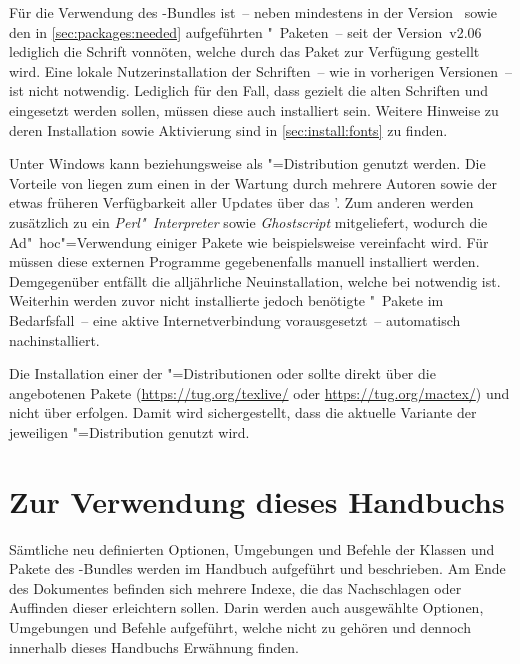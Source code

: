 Für die Verwendung des \TUDScript-Bundles ist~-- neben \KOMAScript mindestens 
in der Version~\vKOMAScript{} sowie den in \autoref{sec:packages:needed} 
aufgeführten "~Paketen~-- seit der Version~v2.06 lediglich die 
Schrift \OpenSans vonnöten, welche durch das Paket  zur 
Verfügung gestellt wird. Eine lokale Nutzerinstallation der Schriften~-- wie in 
vorherigen Versionen~-- ist nicht notwendig. Lediglich für den Fall, dass 
gezielt die alten Schriften \Univers und \DIN eingesetzt werden sollen, müssen 
diese auch installiert sein. Weitere Hinweise zu deren Installation sowie 
Aktivierung sind in \autoref{sec:install:fonts} zu finden.

%
Unter Windows kann  beziehungsweise  
 als "=Distribution genutzt werden. 
Die Vorteile von  liegen zum einen in der 
Wartung durch mehrere Autoren sowie der etwas früheren Verfügbarkeit aller 
Updates über das \CTAN'. Zum anderen werden zusätzlich zu  ein 
\emph{Perl"~Interpreter} sowie \emph{Ghostscript} mitgeliefert, wodurch die 
Ad"~hoc"=Verwendung einiger Pakete wie beispielsweise  
vereinfacht wird. Für  müssen diese externen 
Programme gegebenenfalls manuell installiert werden. Demgegenüber entfällt die 
alljährliche Neuinstallation, welche bei  
notwendig ist. Weiterhin werden zuvor nicht installierte jedoch benötigte 
"~Pakete im Bedarfsfall~-- eine aktive Internetverbindung 
vorausgesetzt~-- automatisch nachinstalliert.

%
Die Installation einer der "=Distributionen 
 oder  sollte 
direkt über die angebotenen Pakete (\url{https://tug.org/texlive/} oder 
\url{https://tug.org/mactex/}) und nicht über  erfolgen. 
Damit wird sichergestellt, dass die aktuelle Variante der jeweiligen 
"=Distribution genutzt wird.



\section{%
  Zur Verwendung dieses Handbuchs%
}
%
Sämtliche neu definierten Optionen, Umgebungen und Befehle der Klassen und 
Pakete des \TUDScript-Bundles werden im Handbuch aufgeführt und beschrieben. Am 
Ende des Dokumentes befinden sich mehrere Indexe, die das Nachschlagen oder 
Auffinden dieser erleichtern sollen. Darin werden auch ausgewählte Optionen, 
Umgebungen und Befehle aufgeführt, welche nicht zu \TUDScript gehören und 
dennoch innerhalb dieses Handbuchs Erwähnung finden.

